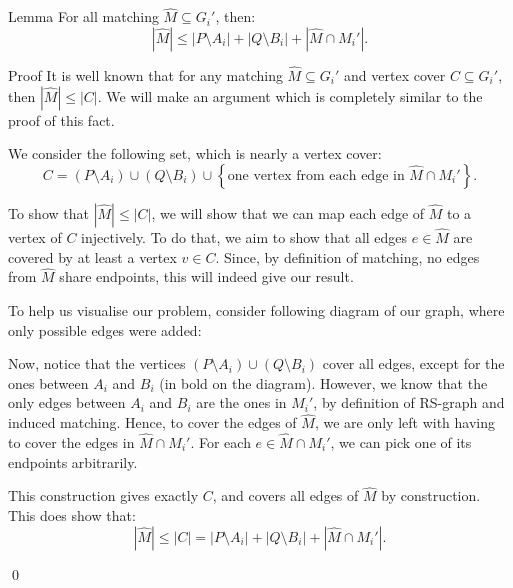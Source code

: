 \documentclass[a4paper]{article}
\begin{document}
\begin{parag}{Lemma}
    For all matching $\hat{M} \subseteq G_i'$, then: 
    \[\left|\hat{M}\right| \leq \left|P \setminus A_i\right| + \left|Q \setminus B_i\right| + \left|\hat{M} \cap M_i'\right|.\]
    
    \begin{subparag}{Proof}
        It is well known that for any matching $\hat{M} \subseteq G_i'$ and vertex cover $C \subseteq G_i'$, then $\left|\hat{M}\right| \leq \left|C\right|$. We will make an argument which is completely similar to the proof of this fact.

        We consider the following set, which is nearly a vertex cover:
        \[C = \left(P \setminus A_i\right) \cup \left(Q \setminus B_i\right) \cup \left\{\text{one vertex from each edge in $\hat{M} \cap M_i'$}\right\}.\]

        To show that $\left|\hat{M}\right| \leq \left|C\right|$, we will show that we can map each edge of $\hat{M}$ to a vertex of $C$ injectively. To do that, we aim to show that all edges $e \in \hat{M}$ are covered by at least a vertex $v \in C$. Since, by definition of matching, no edges from $\hat{M}$ share endpoints, this will indeed give our result.

        To help us visualise our problem, consider following diagram of our graph, where only possible edges were added:

        Now, notice that the vertices $\left(P \setminus A_i\right) \cup \left(Q \setminus B_i\right)$ cover all edges, except for the ones between $A_i$ and $B_i$ (in bold on the diagram). However, we know that the only edges between $A_i$ and $B_i$ are the ones in $M_i'$, by definition of RS-graph and induced matching. Hence, to cover the edges of $\hat{M}$, we are only left with having to cover the edges in $\hat{M} \cap M_i'$. For each $e \in \hat{M} \cap M_i'$, we can pick one of its endpoints arbitrarily.

        This construction gives exactly $C$, and covers all edges of $\hat{M}$ by construction. This does show that: 
        \[\left|\hat{M}\right| \leq \left|C\right| = \left|P \setminus A_i\right| + \left|Q \setminus B_i\right| + \left|\hat{M} \cap M_i'\right|.\]
        
        \qed
    \end{subparag}
\end{parag}
\end{document}
